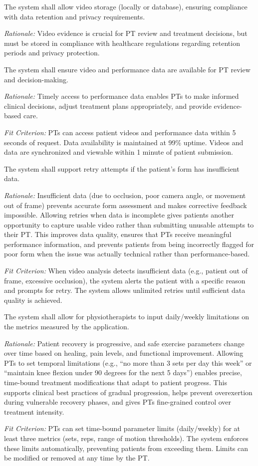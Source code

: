 \documentclass[12pt]{article}
\newcommand{\rationale}[1]{\par\emph{Rationale:} #1}
\newcommand{\fitcrit}[1]{\par\emph{Fit Criterion:} #1}
\begin{document}
\begin{reqlist}
	\item[FR 24.] The system shall allow video storage (locally or database), ensuring compliance with data retention and privacy requirements.
	\rationale{Video evidence is crucial for PT review and treatment decisions, but must be stored in compliance with healthcare regulations regarding retention periods and privacy protection.}
	
	\item[FR 25.] The system shall ensure video and performance data are available for PT review and decision-making.
	\rationale{Timely access to performance data enables PTs to make informed clinical decisions, adjust treatment plans appropriately, and provide evidence-based care.}
	\fitcrit{PTs can access patient videos and performance data within 5 seconds of request. Data availability is maintained at 99\% uptime. Videos and data are synchronized and viewable within 1 minute of patient submission.}
	
	\item[FR 26.] The system shall support retry attempts if the patient's form has insufficient data.
	\rationale{Insufficient data (due to occlusion, poor camera angle, or movement out of frame) prevents accurate form assessment and makes corrective feedback impossible. Allowing retries when data is incomplete gives patients another opportunity to capture usable video rather than submitting unusable attempts to their PT. This improves data quality, ensures that PTs receive meaningful performance information, and prevents patients from being incorrectly flagged for poor form when the issue was actually technical rather than performance-based.}
	\fitcrit{When video analysis detects insufficient data (e.g., patient out of frame, excessive occlusion), the system alerts the patient with a specific reason and prompts for retry. The system allows unlimited retries until sufficient data quality is achieved.}
	
	\item[FR 27.] The system shall allow for physiotherapists to input daily/weekly limitations on the metrics measured by the application.
	\rationale{Patient recovery is progressive, and safe exercise parameters change over time based on healing, pain levels, and functional improvement. Allowing PTs to set temporal limitations (e.g., ``no more than 3 sets per day this week'' or ``maintain knee flexion under 90 degrees for the next 5 days'') enables precise, time-bound treatment modifications that adapt to patient progress. This supports clinical best practices of gradual progression, helps prevent overexertion during vulnerable recovery phases, and gives PTs fine-grained control over treatment intensity.}
	\fitcrit{PTs can set time-bound parameter limits (daily/weekly) for at least three metrics (sets, reps, range of motion thresholds). The system enforces these limits automatically, preventing patients from exceeding them. Limits can be modified or removed at any time by the PT.}
	
\end{reqlist}
\end{document}
